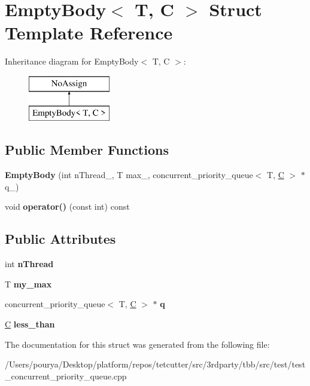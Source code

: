 \hypertarget{structEmptyBody}{}\section{Empty\+Body$<$ T, C $>$ Struct Template Reference}
\label{structEmptyBody}
Inheritance diagram for Empty\+Body$<$ T, C $>$\+:\begin{figure}[H]
\begin{center}
\leavevmode
\includegraphics[height=2.000000cm]{structEmptyBody}
\end{center}
\end{figure}
\subsection*{Public Member Functions}
\begin{DoxyCompactItemize}
\item 
\hypertarget{structEmptyBody_af9c75bff4406b8c79c6594dcf542a544}{}{\bfseries Empty\+Body} (int n\+Thread\+\_\+, T max\+\_\+, concurrent\+\_\+priority\+\_\+queue$<$ T, \hyperlink{classC}{C} $>$ $\ast$q\+\_\+)\label{structEmptyBody_af9c75bff4406b8c79c6594dcf542a544}

\item 
\hypertarget{structEmptyBody_a1740a0f1caff94f33b35b5a69c1ab58a}{}void {\bfseries operator()} (const int) const \label{structEmptyBody_a1740a0f1caff94f33b35b5a69c1ab58a}

\end{DoxyCompactItemize}
\subsection*{Public Attributes}
\begin{DoxyCompactItemize}
\item 
\hypertarget{structEmptyBody_a18efd96e60ecea1ca3b8fe3dd509fe61}{}int {\bfseries n\+Thread}\label{structEmptyBody_a18efd96e60ecea1ca3b8fe3dd509fe61}

\item 
\hypertarget{structEmptyBody_a33acb9a3768172c4916fc34100bc9b4e}{}T {\bfseries my\+\_\+max}\label{structEmptyBody_a33acb9a3768172c4916fc34100bc9b4e}

\item 
\hypertarget{structEmptyBody_a79cf3beef73cb222fcd3b6b6714bde40}{}concurrent\+\_\+priority\+\_\+queue$<$ T, \hyperlink{classC}{C} $>$ $\ast$ {\bfseries q}\label{structEmptyBody_a79cf3beef73cb222fcd3b6b6714bde40}

\item 
\hypertarget{structEmptyBody_ad834d2a7fcfceec2d432c1c4ecad7d84}{}\hyperlink{classC}{C} {\bfseries less\+\_\+than}\label{structEmptyBody_ad834d2a7fcfceec2d432c1c4ecad7d84}

\end{DoxyCompactItemize}


The documentation for this struct was generated from the following file\+:\begin{DoxyCompactItemize}
\item 
/\+Users/pourya/\+Desktop/platform/repos/tetcutter/src/3rdparty/tbb/src/test/test\+\_\+concurrent\+\_\+priority\+\_\+queue.\+cpp\end{DoxyCompactItemize}
